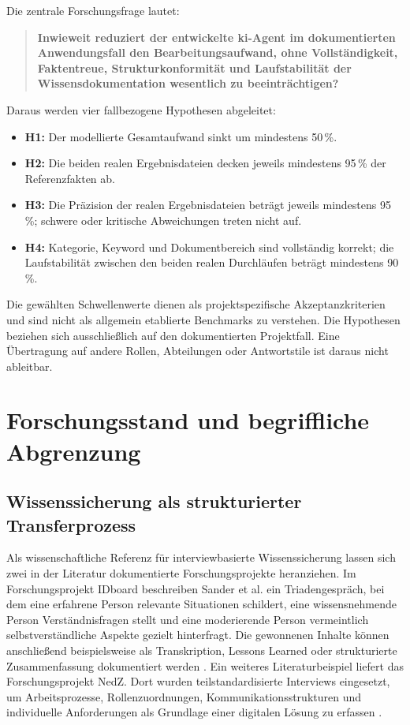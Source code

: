 \documentclass[
  10pt,
  ngerman,
  a4paper,
  toc=graduated,
  numbers=noenddot,
  headings=standardclasses,
  nonumberlist
]{scrartcl}
\newcommand{\pct}[1]{#1\,\%}
\begin{document}
Die zentrale Forschungsfrage lautet:

\begin{quote}
\textbf{Inwieweit reduziert der entwickelte \gls{ki}-Agent im dokumentierten Anwendungsfall den Bearbeitungsaufwand, ohne Vollständigkeit, Faktentreue, Strukturkonformität und Laufstabilität der Wissensdokumentation wesentlich zu beeinträchtigen?}
\end{quote}

Daraus werden vier fallbezogene Hypothesen abgeleitet:

\begin{itemize}
  \item \textbf{H1:} Der modellierte Gesamtaufwand sinkt um mindestens \pct{50}.
  \item \textbf{H2:} Die beiden realen Ergebnisdateien decken jeweils mindestens \pct{95} der Referenzfakten ab.
  \item \textbf{H3:} Die Präzision der realen Ergebnisdateien beträgt jeweils mindestens \pct{95}; schwere oder kritische Abweichungen treten nicht auf.
  \item \textbf{H4:} Kategorie, Keyword und Dokumentbereich sind vollständig korrekt; die Laufstabilität zwischen den beiden realen Durchläufen beträgt mindestens \pct{90}.
\end{itemize}

Die gewählten Schwellenwerte dienen als projektspezifische Akzeptanzkriterien und sind nicht als allgemein etablierte Benchmarks zu verstehen. Die Hypothesen beziehen sich ausschließlich auf den dokumentierten Projektfall. Eine Übertragung auf andere Rollen, Abteilungen oder Antwortstile ist daraus nicht ableitbar.

\section{Forschungsstand und begriffliche Abgrenzung}

\subsection{Wissenssicherung als strukturierter Transferprozess}

Als wissenschaftliche Referenz für interviewbasierte Wissenssicherung lassen sich zwei in der Literatur dokumentierte Forschungsprojekte heranziehen. Im Forschungsprojekt IDboard beschreiben Sander et al. ein Triadengespräch, bei dem eine erfahrene Person relevante Situationen schildert, eine wissensnehmende Person Verständnisfragen stellt und eine moderierende Person vermeintlich selbstverständliche Aspekte gezielt hinterfragt. Die gewonnenen Inhalte können anschließend beispielsweise als Transkription, Lessons Learned oder strukturierte Zusammenfassung dokumentiert werden \cite[S.~132--136]{sander_onboarding_2023}. Ein weiteres Literaturbeispiel liefert das Forschungsprojekt NedZ. Dort wurden teilstandardisierte Interviews eingesetzt, um Arbeitsprozesse, Rollenzuordnungen, Kommunikationsstrukturen und individuelle Anforderungen als Grundlage einer digitalen Lösung zu erfassen \cite[S.~10--11]{boehme_nedz_2023}.
\end{document}
